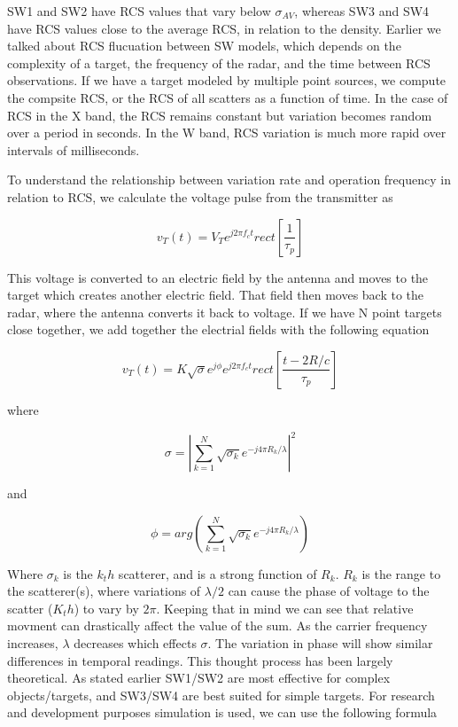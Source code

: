 \documentclass[12pt]{article}
\begin{document}
SW1 and SW2 have RCS values that vary below $\sigma_{AV}$, whereas SW3 and SW4 have RCS values close to the average RCS, in relation to the density. Earlier we talked about RCS flucuation between SW models, which depends on the complexity of a target, the frequency of the radar, and the time between RCS observations. If we have a target modeled by multiple point sources, we compute the compsite RCS, or the RCS of all scatters as a function of time. In the case of RCS in the X band, the RCS remains constant but variation becomes random over a period in seconds. In the W band, RCS variation is much more rapid over intervals of milliseconds. 

To understand the relationship between variation rate and operation frequency in relation to RCS, we calculate the voltage pulse from the transmitter as

\begin{equation}
    v_T(t) = V_T e^{j2\pi f_c t} rect \left[ \frac{1}{\tau_p} \right]
\end{equation}

This voltage is converted to an electric field by the antenna and moves to the target which creates another electric field. That field then moves back to the radar, where the antenna converts it back to voltage. If we have N point targets close together, we add together the electrial fields with the following equation

\begin{equation}
    v_T(t) = K \sqrt{\sigma} e^{j \phi} e^{j2\pi f_c t} rect \left[ \frac{t-2R/c}{\tau_p} \right]
\end{equation}

where

\begin{equation}
    \sigma = \left| \sum_{k=1}^{N} \sqrt{\sigma_k} e^{-j4 \pi R_k / \lambda }  \right| ^ 2
\end{equation}

and 

\begin{equation}
    \phi = arg \left( \sum_{k=1}^{N} \sqrt{\sigma_k} e^{-j4 \pi R_k / \lambda} \right)
\end{equation}

Where $\sigma_k$ is the $k_th$ scatterer, and is a strong function of $R_k$. $R_k$ is the range to the scatterer(s), where variations of $\lambda/2$ can cause the phase of voltage to the scatter ($K_th$) to vary by $2 \pi$. Keeping that in mind we can see that relative movment can drastically affect the value of the sum. As the carrier frequency increases, $\lambda$ decreases which effects $\sigma$. The variation in phase will show similar differences in temporal readings. This thought process has been largely theoretical. As stated earlier SW1/SW2 are most effective for complex objects/targets, and SW3/SW4 are best suited for simple targets. For research and development purposes simulation is used, we can use the following formula
\end{document}
